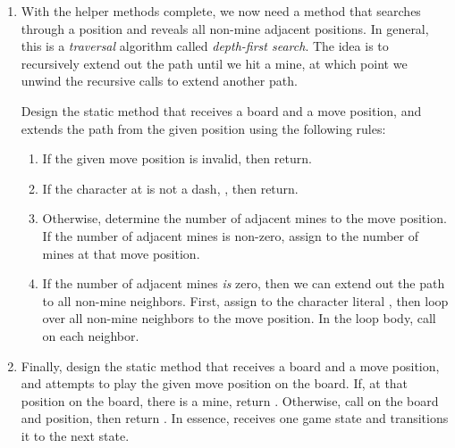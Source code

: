 \begin{enumerate}[label=(\alph*)]
    \item With the helper methods complete, we now need a method that searches through a position and reveals all non-mine adjacent positions. In general, this is a \emph{traversal} algorithm called \emph{depth-first search}. The idea is to recursively extend out the path until we hit a mine, at which point we unwind the recursive calls to extend another path.

    Design the static  method that receives a board and a move position, and extends the path from the given position using the following rules:

    \begin{enumerate}[label=(\roman*)]
        \item If the given move position is invalid, then return.
        \item If the character at  is not a dash, \ttt{\q{}-\q{}}, then return.
        \item Otherwise, determine the number of adjacent mines to the move position. If the number of adjacent mines is non-zero, assign to  the number of mines at that move position.
        \item If the number of adjacent mines \emph{is} zero, then we can extend out the path to all non-mine neighbors. First, assign to  the character literal , then loop over all non-mine neighbors to the move position. In the loop body, call  on each neighbor.
    \end{enumerate}

    \item Finally, design the static  method that receives a board and a move position, and attempts to play the given move position on the board. If, at that position on the board, there is a mine, return . Otherwise, call  on the board and position, then return . In essence,  receives one game state and transitions it to the next state.
\end{enumerate}



